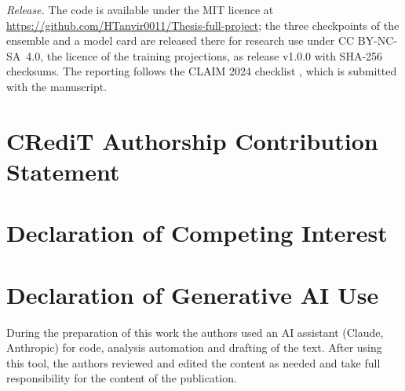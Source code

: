 \emph{Release.} The code is available under the MIT licence at \url{https://github.com/HTanvir0011/Thesis-full-project}; the three
checkpoints of the ensemble and a model card are released there for research use under CC BY-NC-SA~4.0, the licence of the training
projections, as release v1.0.0 with SHA-256 checksums. The reporting follows the
CLAIM 2024 checklist \cite{tejani2024claim}, which is submitted with the manuscript.

\section*{CRediT Authorship Contribution Statement}

\section*{Declaration of Competing Interest}

\section*{Declaration of Generative AI Use}
During the preparation of this work the authors used an AI assistant (Claude, Anthropic) for code, analysis automation and drafting of the
text. After using this tool, the authors reviewed and edited the content as needed and take full responsibility for the content of the
publication. 
